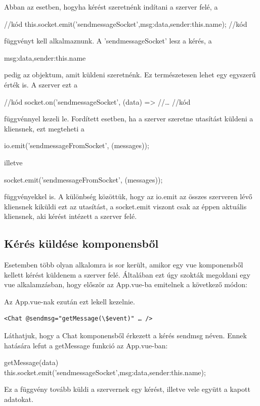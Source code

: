 Abban az esetben, hogyha kérést szeretnénk indítani a szerver felé, a

//kód
this.socket.emit('sendmessageSocket',{msg:data,sender:this.name});
//kód

függvényt kell alkalmaznunk. A 'sendmessageSocket' lesz a kérés, a 
\begin{javascript}
{msg:data,sender:this.name}
\end{javascript}
pedig az objektum, amit küldeni szeretnénk. Ez természetesen lehet egy egyszerű érték is. A szerver ezt a

//kód
socket.on('sendmessageSocket', (data) => {
	//…
}
//kód

függvénnyel kezeli le. Fordített esetben, ha a szerver szeretne utasítást küldeni a kliensnek, ezt megteheti a

\begin{javascript}
io.emit('sendmessageFromSocket', (messages));
\end{javascript}

illetve

\begin{javascript}
socket.emit('sendmessageFromSocket', (messages));
\end{javascript}

függvényekkel is. A különbség közöttük, hogy az io.emit az összes szerveren lévő kliensnek kiküldi ezt az utasítást, a socket.emit viszont csak az éppen aktuális kliensnek, aki kérést intézett a szerver felé.

\subsection{Kérés küldése komponensből}
Esetemben több olyan alkalomra is sor került, amikor egy vue komponensből kellett kérést küldenem a szerver felé. Általában ezt úgy szokták megoldani egy vue alkalamzásban, hogy először az App.vue-ba emitelnek a következő módon:
Az App.vue-nak ezután ezt lekell kezelnie.
\begin{verbatim}
<Chat @sendmsg="getMessage(\$event)" … />
\end{verbatim}
Láthatjuk, hogy a Chat komponensből érkezett a kérés sendmsg néven. Ennek hatására lefut a getMessage funkció az App.vue-ban:
\begin{javascript}
getMessage(data){
	this.socket.emit('sendmessageSocket',{msg:data,sender:this.name});
}
\end{javascript}
Ez a függvény tovább küldi a szervernek egy kérést, illetve vele együtt a kapott adatokat.

